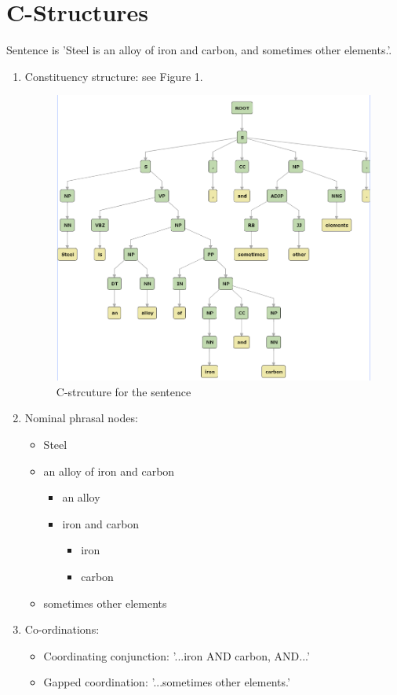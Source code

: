 \documentclass[12pt]{report}
\begin{document}
\section{C-Structures}
Sentence is 'Steel is an alloy of iron and carbon, and sometimes other
elements.'.
\begin{enumerate}
  \item Constituency structure: see Figure 1.
  \begin{figure}[ht]
    \includegraphics[width=\linewidth]{task2img.PNG}
    \caption{C-strcuture for the sentence}
    \label{Cstruct}
  \end{figure}
  \item Nominal phrasal nodes:
  \begin{itemize}
    \item Steel
    \item an alloy of iron and carbon
    \begin{itemize}
      \item an alloy
      \item iron and carbon
      \begin{itemize}
        \item iron
        \item carbon 
      \end{itemize}
    \end{itemize}
    \item sometimes other elements
  \end{itemize}
  \item Co-ordinations:
  \begin{itemize}
    \item Coordinating conjunction: '...iron AND carbon, AND...'
    \item Gapped coordination: '...sometimes other elements.'
  \end{itemize}
\end{enumerate}
\end{document}
